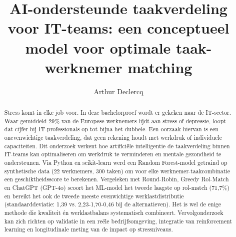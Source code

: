 \documentclass[a0,portrait]{hogent-poster}
\title{AI-ondersteunde taakverdeling voor IT-teams: een conceptueel model voor optimale taak-werknemer matching}
\author{Arthur Declercq}
\begin{document}
\maketitle

\begin{abstract}
Stress komt in elke job voor. In deze bachelorproef wordt er gekeken naar de IT-sector. Waar gemiddeld 29\% van de Europese werknemers lijdt aan stress of depressie, loopt dat cijfer bij IT-professionals op tot bijna het dubbele. Een oorzaak hiervan is een onevenwichtige taakverdeling, dat geen rekening houdt met werkdruk of individuele capaciteiten. Dit onderzoek verkent hoe artificiële intelligentie de taakverdeling binnen IT-teams kan optimaliseren om werkdruk te verminderen en mentale gezondheid te ondersteunen. Via Python en scikit-learn werd een Random Forest-model getraind op synthetische data (22 werknemers, 300 taken) om voor elke werknemer-taakcombinatie een geschiktheidsscore te berekenen. Vergeleken met Round-Robin, Greedy Rol-Match en ChatGPT (GPT-4o) scoort het ML-model het tweede laagste op rol-match (71,7\%) en bereikt het ook de tweede meeste evenwichtige werklastdistributie (standaarddeviatie: 1,39 vs. 2,23-1,70-0,46 bij de alternatieven). Het is wel de enige methode die kwaliteit én werklastbalans systematisch combineert. Vervolgonderzoek kan zich richten op validatie in een reële bedrijfsomgeving, integratie van reinforcement learning en longitudinale meting van de impact op stressniveaus.
\end{abstract}
\end{document}
